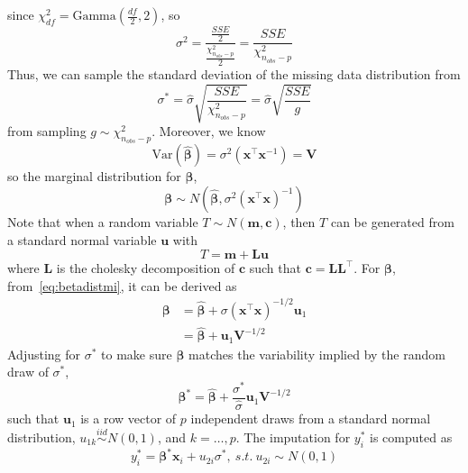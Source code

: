 since $\chi^2_{df}=\text{Gamma}(\frac{df}{2},2)$, so 
\begin{equation} 
    \sigma^2=\frac{\frac{SSE}{2}}{\frac{\chi^2_{n_{obs}-p}}{2}}=\frac{SSE}{\chi^2_{n_{obs}-p}}
\end{equation}
Thus, we can sample the standard deviation of the missing data distribution from 
\begin{equation} 
    \sigma^*=\hat{\sigma}\sqrt{\frac{SSE}{\chi^2_{n_{obs}-p}}}=\hat{\sigma}\sqrt{\frac{SSE}{g}}
\end{equation}
from sampling $g\sim \chi^2_{n_{obs}-p}$. 
Moreover, we know 
\begin{equation} 
    \text{Var}(\hat{\boldsymbol{\beta}})=\sigma^2(\mathbf{x}^{\top}\mathbf{x}^{-1})=\mathbf{V}
\end{equation}
so the marginal distribution for $\boldsymbol{\beta}$, 
\begin{equation}\label{eq:betadistmi}
    \boldsymbol{\beta}\sim N(\hat{\boldsymbol{\beta}}, \sigma^2(\mathbf{x}^{\top}\mathbf{x})^{-1})
\end{equation}
Note that when a random variable $T\sim N(\mathbf{m}, \mathbf{c})$, then $T$ can be generated from a standard normal variable $\mathbf{u}$ with 
\begin{equation} 
    T=\mathbf{m}+\mathbf{L}\mathbf{u}
\end{equation}
where $\mathbf{L}$ is the cholesky decomposition of $\mathbf{c}$ such that $\mathbf{c}=\mathbf{L}\mathbf{L}^{\top}$.
For $\boldsymbol{\beta}$, from~\ref{eq:betadistmi}, it can be derived as 
\begin{align} 
    \boldsymbol{\beta}&=\hat{\boldsymbol{\beta}}+\sigma ( \mathbf{x}^{\top}\mathbf{x} )^{-1/2}\mathbf{u}_1\\
    &=\hat{\boldsymbol{\beta}}+\mathbf{u}_1\mathbf{V}^{-1/2}
\end{align}
Adjusting for $\sigma^*$ to make sure $\boldsymbol{\beta}$ matches the variability implied by the random draw of $\sigma^*$, 
\begin{equation} 
    \boldsymbol{\beta}^*=\hat{\boldsymbol{\beta}}+\frac{\sigma^*}{\hat{\sigma}}\mathbf{u}_1\mathbf{V}^{-1/2}
\end{equation}
such that $\mathbf{u}_1$ is a row vector of $p$ independent draws from a standard normal distribution, $u_{1k}\stackrel{iid}{\sim} N(0,1)$, and $k=\ldots,p$. 
The imputation for $y_i^*$ is computed as 
\begin{equation} 
    y_i^*=\boldsymbol{\beta}^*\mathbf{x}_i+u_{2i}\sigma^*,~ s.t.~ u_{2i}\sim N(0,1)
\end{equation}
